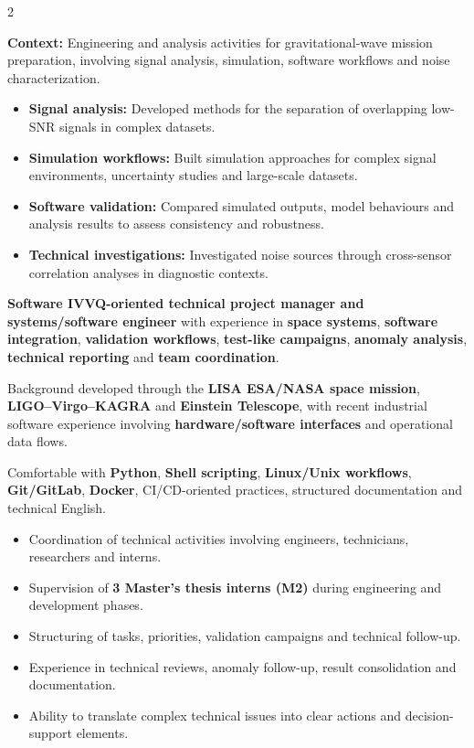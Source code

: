 \documentclass[8pt,a4paper,ragged2e,withhyper]{altacv}
\begin{document}
\begin{paracol}{2}
\divider


\textbf{Context:} Engineering and analysis activities for gravitational-wave mission preparation, involving signal analysis, simulation, software workflows and noise characterization.

\begin{itemize}
\item \textbf{Signal analysis:} Developed methods for the separation of overlapping low-SNR signals in complex datasets.
\item \textbf{Simulation workflows:} Built simulation approaches for complex signal environments, uncertainty studies and large-scale datasets.
\item \textbf{Software validation:} Compared simulated outputs, model behaviours and analysis results to assess consistency and robustness.
\item \textbf{Technical investigations:} Investigated noise sources through cross-sensor correlation analyses in diagnostic contexts.
\end{itemize}

\switchcolumn


\textbf{Software IVVQ-oriented technical project manager and systems/software engineer} with experience in \textbf{space systems}, \textbf{software integration}, \textbf{validation workflows}, \textbf{test-like campaigns}, \textbf{anomaly analysis}, \textbf{technical reporting} and \textbf{team coordination}.

Background developed through the \textbf{LISA ESA/NASA space mission}, \textbf{LIGO--Virgo--KAGRA} and \textbf{Einstein Telescope}, with recent industrial software experience involving \textbf{hardware/software interfaces} and operational data flows.

Comfortable with \textbf{Python}, \textbf{Shell scripting}, \textbf{Linux/Unix workflows}, \textbf{Git/GitLab}, \textbf{Docker}, CI/CD-oriented practices, structured documentation and technical English.


\begin{itemize}
  \item Coordination of technical activities involving engineers, technicians, researchers and interns.
  \item Supervision of \textbf{3 Master's thesis interns (M2)} during engineering and development phases.
  \item Structuring of tasks, priorities, validation campaigns and technical follow-up.
  \item Experience in technical reviews, anomaly follow-up, result consolidation and documentation.
  \item Ability to translate complex technical issues into clear actions and decision-support elements.
\end{itemize}


\end{paracol}
\end{document}

